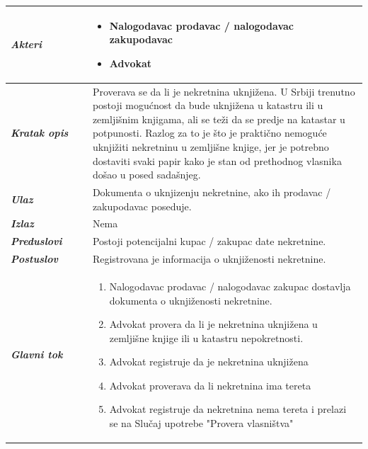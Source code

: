 \documentclass[20pt]{article}
\begin{document}
\begin{center}
\begin{longtable}{p{0.23\linewidth} p{0.77\linewidth}}
 \hline
 {\it \bfseries Akteri} & \begin{itemize}
    \item Nalogodavac prodavac / nalogodavac zakupodavac
    \item Advokat
\end{itemize}\\
\hline

 {\it \bfseries Kratak opis} & Proverava se da li je nekretnina uknji\v zena. U Srbiji trenutno postoji mogu\' cnost da bude uknji\v zena u katastru ili u zemlji\v snim knjigama, ali se te\v zi da se predje na katastar u potpunosti. Razlog za to je \v sto je prakti\v cno nemogu\' ce uknji\v ziti nekretninu u zemlji\v sne knjige, jer je potrebno dostaviti svaki papir kako je stan od prethodnog vlasnika do\v sao u posed sada\v snjeg.\\ 
 \hline
 
 {\it \bfseries Ulaz} & Dokumenta o uknjizenju nekretnine, ako ih prodavac / zakupodavac poseduje.\\ 
 \hline
 
 {\it \bfseries Izlaz} & Nema\\
 \hline
 
 {\it \bfseries Preduslovi} & Postoji potencijalni kupac / zakupac date nekretnine.\\
 \hline

 {\it \bfseries Postuslov} & Registrovana je informacija o uknji\v zenosti nekretnine.\\
 \hline

     {\it \bfseries Glavni tok} &  
     \begin{enumerate}
        \item Nalogodavac prodavac / nalogodavac zakupac dostavlja dokumenta o uknji\v zenosti nekretnine.
        \item Advokat provera da li je nekretnina uknji\v zena u zemlji\v sne knjige ili u katastru nepokretnosti.
        \item Advokat registruje da je nekretnina uknji\v zena 
        \item Advokat proverava da li nekretnina ima tereta 
        \item Advokat registruje da nekretnina nema tereta i prelazi se na Slu\v{c}aj upotrebe "Provera vlasni\v stva"
    \end{enumerate}\\
 \hline

\end{longtable}
\end{center}
\end{document}
